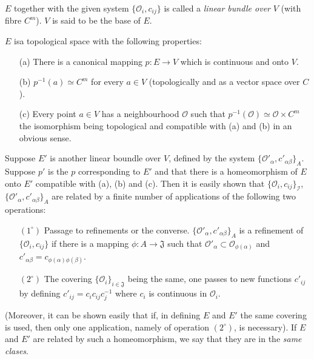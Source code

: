\begin{defi*}
$E$ together with the given system $\{\mathscr{O}_i, c_{ij}\}$ is
  called a \textit{linear bundle over} $V$ (with fibre $C^m$). $V$ is
  said to be the base of $E$. 

$E$ is\pageoriginale a  topological space with the following
  properties:
\begin{itemize}
\item[(a)] There is a canonical mapping $p: E \to V$ which is
  continuous and onto $V$.

\item[(b)] $p^{-1} (a) \simeq C^m$ for every $a \in V$ (topologically
  and as a vector space over $C$). 

\item[(c)] Every point $a \in V$ has a neighbourhood $\mathscr{O}$
  such that $p^{-1}(\mathscr{O}) \simeq \mathscr{O} \times C^m$ the
  isomorphism being topological and compatible with (a) and (b) in an
  obvious sense.
\end{itemize}
\end{defi*}

Suppose $E'$ is another linear boundle over $V$, defined by the system
$\{\mathscr{O}'_\alpha, c'_{\alpha \beta}\}_A$. Suppose $p'$ is the
$p$ corresponding to $E'$ and that there is a homeomorphism of $E$
onto $E'$ compatible with (a), (b) and (c). Then it is easily shown
that $\{\mathscr{O}_i, c_{ij}\}_{\mathscr{I}}$,
$\{\mathscr{O}'_\alpha, c'_{\alpha \beta}\}_A$ are related by a finite
number of applications of the following two operations:
\begin{itemize}
\item[$(1^\circ)$] Passage to refinements or the
  converse. $\{\mathscr{O}'_\alpha, c'_{\alpha \beta}\}_A$ is a
  refinement of $\{\mathscr{O}_i, c_{ij}\}$ if there is a mapping
  $\phi: A \to \mathfrak{J}$ such that $\mathscr{O}'_\alpha \subset
  \mathscr{O}_{\phi (\alpha)}$ and $c'_{\alpha\beta} = c_{\phi
    (\alpha) \phi (\beta)}$. 

\item[$(2^\circ)$] The covering $\{\mathscr{O}_i\}_{i
  \in\mathfrak{J}}$ being the same, one passes to new functions
  $c'_{ij}$ by defining $c'_{ij} = c_i c_{ij} c^{-1}_j$ where $c_i$ is
  continuous in $\mathscr{O}_i$.
\end{itemize}

(Moreover, it can be shown easily that if, in defining $E$ and $E'$
the same covering is used, then only one application, namely of
operation $(2^\circ)$, is necessary). If $E$ and $E'$ are related by
such a homeomorphism, we say that they are in the \textit{same
  clases}.

